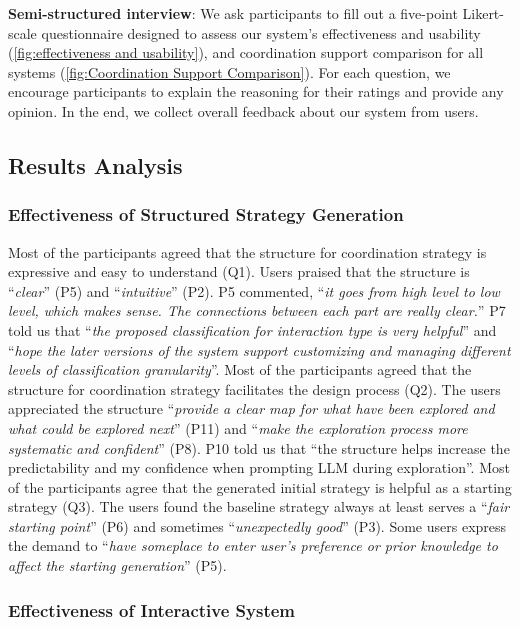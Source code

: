 \textbf{Semi-structured interview}: 
We ask participants to fill out a five-point Likert-scale questionnaire designed to assess our system's effectiveness and usability (\cref{fig:effectiveness and usability}), and coordination support comparison for all systems (\cref{fig:Coordination Support Comparison}). For each question, we encourage participants to explain the reasoning for their ratings and provide any opinion. In the end, we collect overall feedback about our system from users.

\subsection{Results Analysis}


\subsubsection{Effectiveness of Structured Strategy Generation}
Most of the participants agreed that the structure for coordination strategy is expressive and easy to understand (Q1). Users praised that the structure is ``\textit{clear}'' (P5) and ``\textit{intuitive}'' (P2). P5 commented, ``\textit{it goes from high level to low level, which makes sense. The connections between each part are really clear.}'' P7 told us that ``\textit{the proposed classification for interaction type is very helpful}'' and ``\textit{hope the later versions of the system support customizing and managing different levels of classification granularity}''. Most of the participants agreed that the structure for coordination strategy facilitates the design process (Q2). The users appreciated the structure ``\textit{provide a clear map for what have been explored and what could be explored next}'' (P11) and ``\textit{make the exploration process more systematic and confident}'' (P8). P10 told us that ``the structure helps increase the predictability and my confidence when prompting LLM during exploration''. Most of the participants agree that the generated initial strategy is helpful as a starting strategy (Q3). The users found the baseline strategy always at least serves a ``\textit{fair starting point}'' (P6) and sometimes ``\textit{unexpectedly good}'' (P3). Some users express the demand to ``\textit{have someplace to enter user's preference or prior knowledge to affect the starting generation}'' (P5).



\subsubsection{Effectiveness of Interactive System}

